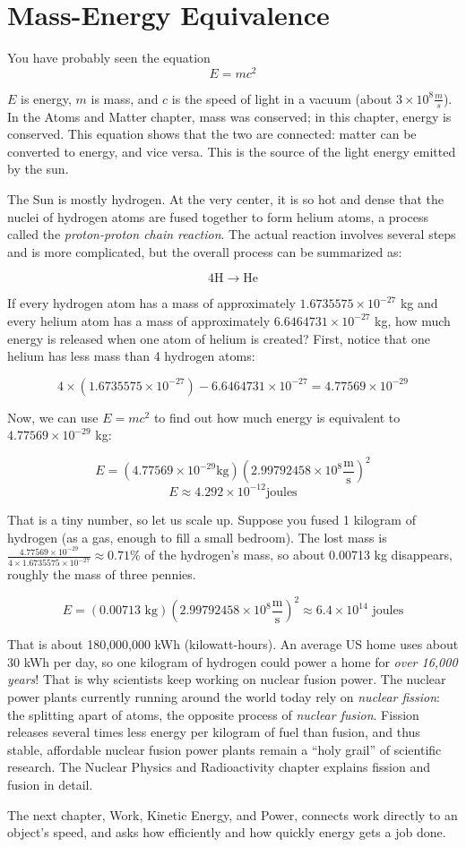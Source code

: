 \section{Mass-Energy Equivalence}
You have probably seen the equation
$$E = mc^2$$

$E$ is energy, $m$ is mass, and $c$ is the speed of light in a vacuum (about $3 
\times 10^8 \frac{m}{s}$). In the Atoms and Matter chapter, mass was conserved; in this chapter, energy
is conserved. This equation shows that the two are connected: matter can be
converted to energy, and vice versa. This is the source of the light energy emitted by the sun. 

The Sun is mostly hydrogen. At the very center, it is so hot and dense that the 
nuclei of hydrogen atoms are fused together to form helium atoms, a process 
called the \textit{proton-proton chain reaction}. The actual reaction involves several 
steps and is more complicated, but the overall process can be summarized as:

$$4\text{H} \to \text{He}$$

If every hydrogen atom has a mass of approximately $1.6735575 \times 10^{-27}$ kg 
and every helium atom has a mass of approximately $6.6464731 \times 10^{-27}$ kg, 
how much energy is released when one atom of helium is created? First, notice 
that one helium has less mass than 4 hydrogen atoms:

$$4 \times \left( 1.6735575 \times 10^{-27} \right) - 6.6464731 \times 10^{-27} = 
4.77569 \times 10^{-29}$$

Now, we can use $E = mc^2$ to find out how much energy is equivalent to $4.77569 
\times 10^{-29}$ kg:

$$E = \left( 4.77569 \times 10^{-29} \text{kg} \right) \left( 2.99792458 \times 
10^8 \frac{\text{m}}{\text{s}} \right)^2$$
$$E \approx 4.292 \times 10^{-12} \text{joules}$$

That is a tiny number, so let us scale up. Suppose you fused 1 kilogram of hydrogen (as a gas, enough to fill a small bedroom). The lost mass is $\frac{4.77569 \times 10^{-29}}{4 \times 1.6735575 \times 10^{-27}} \approx 0.71\%$ of the hydrogen's mass, so about 0.00713 kg disappears, roughly the mass of three pennies.

$$E = \left( 0.00713 \text{ kg} \right) \left( 2.99792458 \times 10^8 \frac{
\text{m}}{\text{s}} \right)^2 \approx 6.4 \times 10^{14} \text{ joules}$$

That is about 180,000,000 kWh (kilowatt-hours). An average US home uses about 30 kWh per day, so one kilogram of hydrogen could power a home for \textit{over 16,000 years}! That is why scientists keep working on nuclear fusion power. The nuclear power plants currently running around the world 
today rely on \textit{nuclear fission}: the splitting apart of atoms, the opposite
process of \textit{nuclear fusion}. Fission releases several times less energy 
per kilogram of fuel than fusion, and thus stable, affordable 
nuclear fusion power plants remain a ``holy grail'' of scientific research. The Nuclear Physics and
Radioactivity chapter explains fission and fusion in detail.

The next chapter, Work, Kinetic Energy, and Power, connects work directly to an object's speed, and asks
how efficiently and how quickly energy gets a job done.
